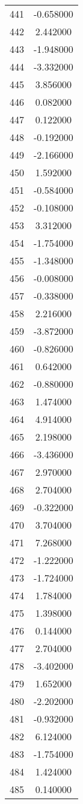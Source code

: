 \documentclass[12pt]{article}
\begin{document}
\begin{longtable}{@{}cc@{}}
441 & -0.658000 \\
442 & 2.442000 \\
443 & -1.948000 \\
444 & -3.332000 \\
445 & 3.856000 \\
446 & 0.082000 \\
447 & 0.122000 \\
448 & -0.192000 \\
449 & -2.166000 \\
450 & 1.592000 \\
451 & -0.584000 \\
452 & -0.108000 \\
453 & 3.312000 \\
454 & -1.754000 \\
455 & -1.348000 \\
456 & -0.008000 \\
457 & -0.338000 \\
458 & 2.216000 \\
459 & -3.872000 \\
460 & -0.826000 \\
461 & 0.642000 \\
462 & -0.880000 \\
463 & 1.474000 \\
464 & 4.914000 \\
465 & 2.198000 \\
466 & -3.436000 \\
467 & 2.970000 \\
468 & 2.704000 \\
469 & -0.322000 \\
470 & 3.704000 \\
471 & 7.268000 \\
472 & -1.222000 \\
473 & -1.724000 \\
474 & 1.784000 \\
475 & 1.398000 \\
476 & 0.144000 \\
477 & 2.704000 \\
478 & -3.402000 \\
479 & 1.652000 \\
480 & -2.202000 \\
481 & -0.932000 \\
482 & 6.124000 \\
483 & -1.754000 \\
484 & 1.424000 \\
485 & 0.140000 \\

\end{longtable}
\end{document}
